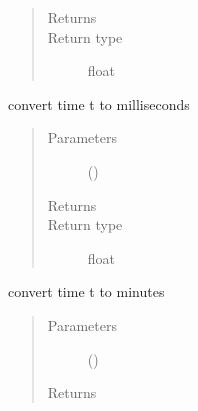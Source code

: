 \documentclass[letterpaper,10pt,english]{sphinxmanual}
\begin{document}
\begin{fulllineitems}
\begin{fulllineitems}
\begin{quote}
\begin{description}
\item[{Returns}] \leavevmode
{}

\item[{Return type}] \leavevmode
float

\end{description}\end{quote}

\end{fulllineitems}


\begin{fulllineitems}
\label{\detokenize{Reference:salabim.Environment.to_milliseconds}}
convert time t to milliseconds
\begin{quote}\begin{description}
\item[{Parameters}] \leavevmode
{} () \textendash{} 

\item[{Returns}] \leavevmode
{}

\item[{Return type}] \leavevmode
float

\end{description}\end{quote}

\end{fulllineitems}


\begin{fulllineitems}
\label{\detokenize{Reference:salabim.Environment.to_minutes}}
convert time t to minutes
\begin{quote}\begin{description}
\item[{Parameters}] \leavevmode
{} () \textendash{} 

\item[{Returns}] \leavevmode
{}


\end{description}
\end{quote}
\end{fulllineitems}
\end{fulllineitems}
\end{document}
